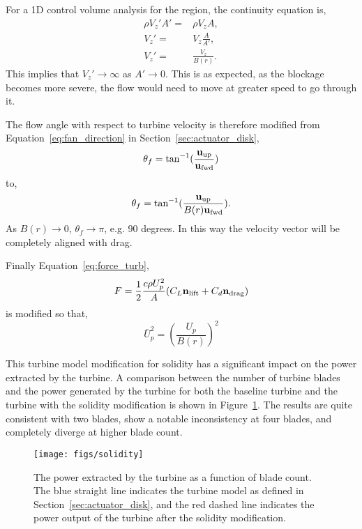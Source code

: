 For a 1D control volume analysis for the region, the continuity
equation is, 
\begin{eqnarray}
 \rho V_z' A' =& \rho V_z A,\\
 V_z' =& V_z \frac{A}{A'}, \\
 V_z' =& \frac{V_z}{B(r)}.
\end{eqnarray}
This implies that $V_z' \rightarrow \infty$ as $A' \rightarrow
0$. This is as expected, as the blockage becomes more severe, the flow
would need to move at greater speed to go through it. 

The flow angle with respect to turbine velocity is therefore modified 
from Equation~\ref{eq:fan_direction} in
Section~\ref{sec:actuator_disk},
\begin{equation}
 \theta_f = \text{tan}^{-1}(\frac{{\bf u_{\text{up}}}}{{\bf u_{\text{fwd}}}})
\end{equation}
to,
\begin{equation}
 \theta_f = \text{tan}^{-1}(\frac{{\bf u_{\text{up}}}}{B(r) {\bf  u_{\text{fwd}}}}). 
\end{equation}
As $B(r) \rightarrow 0$, $\theta_f \rightarrow \pi$, e.g. 90 degrees. In
this way the velocity vector will be completely aligned with drag. 

Finally Equation~\ref{eq:force_turb}, 
\begin{equation}
 F = \frac{1}{2}\frac{c \rho U_p^2}{A}(C_L  {\bf n_{\text{lift}}} + C_d
   {\bf n_{\text{drag}}})
\end{equation}
is modified so that, 
\begin{equation}
 \bar U_p^{2} = \left(\frac{U_p}{B(r)}\right)^2
\end{equation}

This turbine model modification for solidity has a significant impact on
the power extracted by the turbine. A comparison between the number of
turbine blades and the power generated by the turbine for both the
baseline turbine and the turbine with the solidity modification is shown in
Figure~\ref{fig:turbine_solidity}. The results are quite consistent with
two blades, show a notable inconsistency at four blades, and completely
diverge at higher blade count. 

  \begin{figure}[!htb]
   \begin{center}
    \texttt{[image: figs/solidity]}
    \caption{The power extracted by the turbine as a function of blade
    count. The blue straight line indicates the turbine model as defined
    in Section~\ref{sec:actuator_disk}, and the red dashed line
    indicates the power output of the turbine after the solidity
    modification.}
    \label{fig:turbine_solidity}
   \end{center}
  \end{figure}

